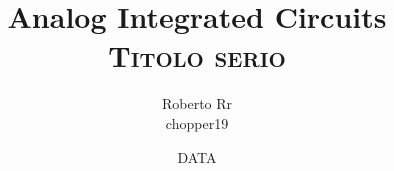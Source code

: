 \documentclass[11pt,a4paper,oneside,openright,titlepage]{article}
\title{	Analog Integrated Circuits \\
	\huge {\textsc{Titolo serio}}	}
\begin{document}
\author{Roberto Rr\\ chopper19\\
}
\date{DATA}
\maketitle	
\tableofcontents
\newpage
\newpage
\newpage
\newpage
\newpage
\newpage
\newpage
\newpage
\end{document}
